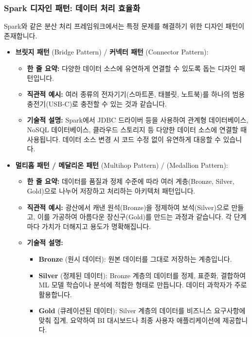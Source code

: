 \documentclass[11pt,a4paper]{article}
\theoremstyle{definition}
\begin{document}
\subsubsection*{Spark 디자인 패턴: 데이터 처리 효율화}
Spark와 같은 분산 처리 프레임워크에서는 특정 문제를 해결하기 위한 디자인 패턴이 존재합니다.
\begin{itemize}
    \item \textbf{브릿지 패턴} (Bridge Pattern) / \textbf{커넥터 패턴} (Connector Pattern):
    \begin{itemize}
        \item \textbf{한 줄 요약:} 다양한 데이터 소스에 유연하게 연결할 수 있도록 돕는 디자인 패턴입니다.
        \item \textbf{직관적 예시:} 여러 종류의 전자기기(스마트폰, 태블릿, 노트북)를 하나의 범용 충전기(USB-C)로 충전할 수 있는 것과 같습니다.
        \item \textbf{기술적 설명:} Spark에서 JDBC 드라이버 등을 사용하여 관계형 데이터베이스, NoSQL 데이터베이스, 클라우드 스토리지 등 다양한 데이터 소스에 연결할 때 사용됩니다. 데이터 소스 변경 시 코드 수정 없이 유연하게 대응할 수 있습니다.
    \end{itemize}
    \item \textbf{멀티홉 패턴 / 메달리온 패턴} (Multihop Pattern) / (Medallion Pattern):
    \begin{itemize}
        \item \textbf{한 줄 요약:} 데이터를 품질과 정제 수준에 따라 여러 계층(Bronze, Silver, Gold)으로 나누어 저장하고 처리하는 아키텍처 패턴입니다.
        \item \textbf{직관적 예시:} 광산에서 캐낸 원석(Bronze)을 정제하여 보석(Silver)으로 만들고, 이를 가공하여 아름다운 장신구(Gold)를 만드는 과정과 같습니다. 각 단계마다 가치가 더해지고 용도가 명확해집니다.
        \item \textbf{기술적 설명:}
        \begin{itemize}
            \item \textbf{Bronze} (원시 데이터): 원본 데이터를 그대로 저장하는 계층입니다.
            \item \textbf{Silver} (정제된 데이터): Bronze 계층의 데이터를 정제, 표준화, 결합하여 ML 모델 학습이나 분석에 적합한 형태로 만듭니다. 데이터 과학자가 주로 활용합니다.
            \item \textbf{Gold} (큐레이션된 데이터): Silver 계층의 데이터를 비즈니스 요구사항에 맞춰 집계, 요약하여 BI 대시보드나 최종 사용자 애플리케이션에 제공합니다.
        \end{itemize}

\end{itemize}
\end{itemize}
\end{document}
